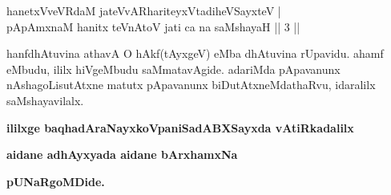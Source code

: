 
\begin{shl}
hanetxVveVRdaM jateVvAR\s hariteyxVtadiheVSayxteV | \\
pApAmxnaM hanitx teVnAtoV jati ca na saMshayaH \hfill ||  3 || 
\end{shl}

\begin{artha}
hanfdhAtuvina athavA O hAkf(tAyxgeV) eMba dhAtuvina rUpavidu. ahamf eMbudu, ililx hiVgeMbudu saMmatavAgide. adariMda pApavanunx nAshagoLisutAtxne matutx pApavanunx biDutAtxneMdathaRvu, idaralilx saMshayavilalx.
\end{artha}

\begin{center}
{\bf ililxge baqhadAraNayxkoVpaniSadABXSayxda vAtiRkadalilx}
\smallskip

{\bf aidane adhAyxyada aidane bArxhamxNa}
\smallskip

{\bf pUNaRgoMDide.}
\end{center}
